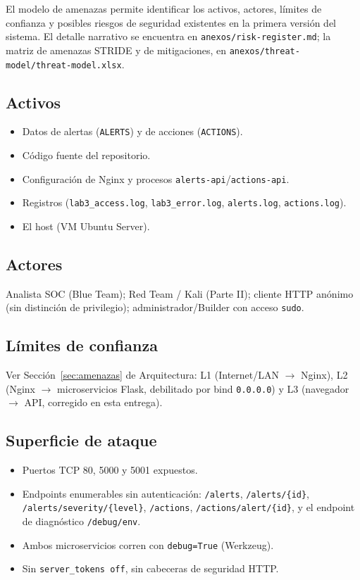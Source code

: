 \documentclass[journal]{IEEEtran}
\begin{document}
El modelo de amenazas permite identificar los activos, actores, límites de
confianza y posibles riesgos de seguridad existentes en la primera versión
del sistema. El detalle narrativo se encuentra en \texttt{anexos/risk-register.md};
la matriz de amenazas STRIDE y de mitigaciones, en
\texttt{anexos/threat-model/threat-model.xlsx}.

\subsection{Activos}

\begin{itemize}
    \item Datos de alertas (\texttt{ALERTS}) y de acciones (\texttt{ACTIONS}).
    \item Código fuente del repositorio.
    \item Configuración de Nginx y procesos \texttt{alerts-api}/\texttt{actions-api}.
    \item Registros (\texttt{lab3\_access.log}, \texttt{lab3\_error.log},
    \texttt{alerts.log}, \texttt{actions.log}).
    \item El host (VM Ubuntu Server).
\end{itemize}

\subsection{Actores}

Analista SOC (Blue Team); Red Team / Kali (Parte II); cliente HTTP anónimo (sin
distinción de privilegio); administrador/Builder con acceso \texttt{sudo}.

\subsection{Límites de confianza}

Ver Sección~\ref{sec:amenazas} de Arquitectura: L1 (Internet/LAN
$\rightarrow$ Nginx), L2 (Nginx $\rightarrow$ microservicios Flask, debilitado
por bind \texttt{0.0.0.0}) y L3 (navegador $\rightarrow$ API, corregido en
esta entrega).

\subsection{Superficie de ataque}

\begin{itemize}
    \item Puertos TCP 80, 5000 y 5001 expuestos.
    \item Endpoints enumerables sin autenticación: \texttt{/alerts},
    \texttt{/alerts/\{id\}}, \texttt{/alerts/severity/\{level\}},
    \texttt{/actions}, \texttt{/actions/alert/\{id\}}, y el endpoint de
    diagnóstico \texttt{/debug/env}.
    \item Ambos microservicios corren con \texttt{debug=True} (Werkzeug).
    \item Sin \texttt{server\_tokens off}, sin cabeceras de seguridad HTTP.
\end{itemize}
\end{document}
